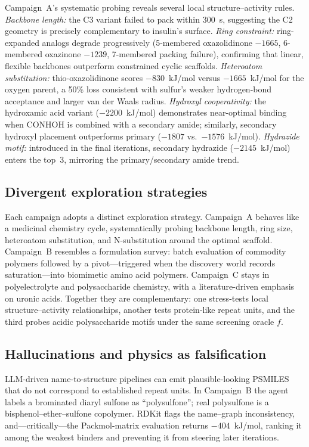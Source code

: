 \documentclass[twocolumn]{fairmeta}
\begin{document}
Campaign~A's systematic probing reveals several local structure--activity rules.
\emph{Backbone length:} the C3 variant failed to pack within 300~s, suggesting the C2 geometry is precisely complementary to insulin's surface.
\emph{Ring constraint:} ring-expanded analogs degrade progressively (5-membered oxazolidinone $-1665$, 6-membered oxazinone $-1239$, 7-membered packing failure), confirming that linear, flexible backbones outperform constrained cyclic scaffolds.
\emph{Heteroatom substitution:} thio-oxazolidinone scores $-830$~kJ/mol versus $-1665$~kJ/mol for the oxygen parent, a 50\% loss consistent with sulfur's weaker hydrogen-bond acceptance and larger van der Waals radius.
\emph{Hydroxyl cooperativity:} the hydroxamic acid variant ($-2200$~kJ/mol) demonstrates near-optimal binding when CONHOH is combined with a secondary amide; similarly, secondary hydroxyl placement outperforms primary ($-1807$ vs.\ $-1576$~kJ/mol).
\emph{Hydrazide motif:} introduced in the final iterations, secondary hydrazide ($-2145$~kJ/mol) enters the top~3, mirroring the primary/secondary amide trend.

\subsection{Divergent exploration strategies}

Each campaign adopts a distinct exploration strategy.
Campaign~A behaves like a medicinal chemistry cycle, systematically probing backbone length, ring size, heteroatom substitution, and N-substitution around the optimal scaffold.
Campaign~B resembles a formulation survey: batch evaluation of commodity polymers followed by a pivot---triggered when the discovery world records saturation---into biomimetic amino acid polymers.
Campaign~C stays in polyelectrolyte and polysaccharide chemistry, with a literature-driven emphasis on uronic acids.
Together they are complementary: one stress-tests local structure--activity relationships, another tests protein-like repeat units, and the third probes acidic polysaccharide motifs under the same screening oracle $f$.

\subsection{Hallucinations and physics as falsification}

LLM-driven name-to-structure pipelines can emit plausible-looking PSMILES that do not correspond to established repeat units.
In Campaign~B the agent labels a brominated diaryl sulfone as ``polysulfone''; real polysulfone is a bisphenol--ether--sulfone copolymer.
RDKit flags the name--graph inconsistency, and---critically---the Packmol-matrix evaluation returns $-404$~kJ/mol, ranking it among the weakest binders and preventing it from steering later iterations.
\end{document}
